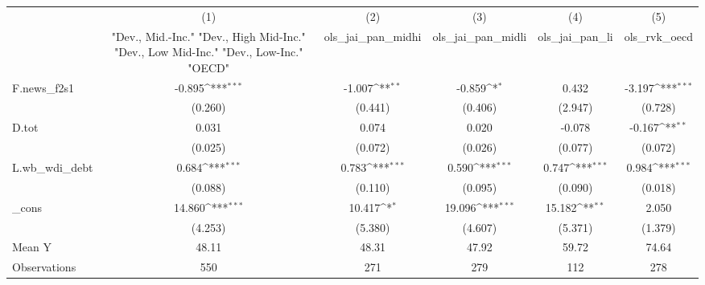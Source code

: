 {
\def\sym#1{\ifmmode^{#1}\else\(^{#1}\)\fi}
\begin{tabular}{l*{5}{c}}
\toprule
            &\multicolumn{1}{c}{(1)}&\multicolumn{1}{c}{(2)}&\multicolumn{1}{c}{(3)}&\multicolumn{1}{c}{(4)}&\multicolumn{1}{c}{(5)}\\
            &\multicolumn{1}{c}{ "Dev., Mid.-Inc." "Dev., High Mid-Inc." "Dev., Low Mid-Inc." "Dev., Low-Inc." "OECD" }&\multicolumn{1}{c}{ols\_jai\_pan\_midhi}&\multicolumn{1}{c}{ols\_jai\_pan\_midli}&\multicolumn{1}{c}{ols\_jai\_pan\_li}&\multicolumn{1}{c}{ols\_rvk\_oecd}\\
\midrule
F.news\_f2s1 &      -0.895\sym{***}&      -1.007\sym{**} &      -0.859\sym{*}  &       0.432         &      -3.197\sym{***}\\
            &     (0.260)         &     (0.441)         &     (0.406)         &     (2.947)         &     (0.728)         \\
\addlinespace
D.tot       &       0.031         &       0.074         &       0.020         &      -0.078         &      -0.167\sym{**} \\
            &     (0.025)         &     (0.072)         &     (0.026)         &     (0.077)         &     (0.072)         \\
\addlinespace
L.wb\_wdi\_debt&       0.684\sym{***}&       0.783\sym{***}&       0.590\sym{***}&       0.747\sym{***}&       0.984\sym{***}\\
            &     (0.088)         &     (0.110)         &     (0.095)         &     (0.090)         &     (0.018)         \\
\addlinespace
\_cons      &      14.860\sym{***}&      10.417\sym{*}  &      19.096\sym{***}&      15.182\sym{**} &       2.050         \\
            &     (4.253)         &     (5.380)         &     (4.607)         &     (5.371)         &     (1.379)         \\
\midrule
Mean Y      &       48.11         &       48.31         &       47.92         &       59.72         &       74.64         \\
Observations&         550         &         271         &         279         &         112         &         278         \\
\bottomrule
\end{tabular}
}
